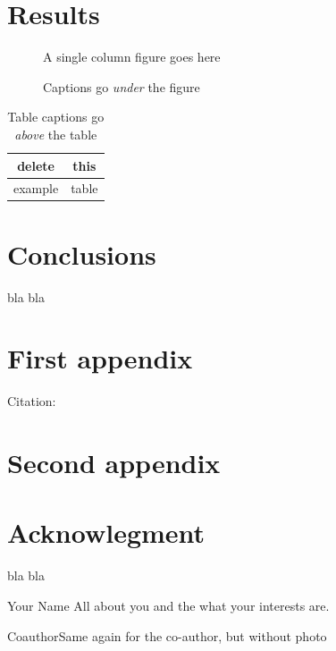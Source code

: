 \documentclass[twocolumn,english]{IEEEtran}
\providecommand{\tabularnewline}{\\}
\theoremstyle{plain}
\theoremstyle{plain}
\begin{document}
\section{Results}

\begin{figure}[htbp]
\begin{centering}
\textsf{A single column figure goes here}
\par\end{centering}

\caption{Captions go \emph{under} the figure}
\end{figure}
\begin{table}[htbp]
\caption{Table captions go \emph{above} the table}


\centering{}%
\begin{tabular}{|c|c|}
\hline 
delete & this\tabularnewline
\hline 
\hline 
example & table\tabularnewline
\hline 
\end{tabular}
\end{table}



\section{Conclusions}

bla bla


\appendices{}


\section{First appendix}

Citation: \cite{IEEEexample:beebe_archive}


\section{Second appendix}


\section*{Acknowlegment}

bla bla




\begin{IEEEbiography}
{Your Name} All about you and the what your interests are.

\end{IEEEbiography}

\begin{IEEEbiographynophoto}
{Coauthor}Same again for the co-author, but without photo\end{IEEEbiographynophoto}
\end{document}
